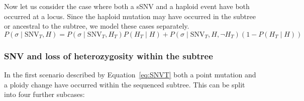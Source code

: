 \documentclass[../../main.tex]{subfiles}
\begin{document}
Now let us consider the case where both a sSNV and a haploid event have both occurred at a locus. Since the haploid mutation may have occurred in the subtree or ancestral to the subtree, we model these cases separately.
\begin{equation}
P(\sigma\mid\text{SNV}_T,H) = P(\sigma\mid\text{SNV}_T,H_T)P(H_T\mid H) + P(\sigma\mid\text{SNV}_T,H,\neg H_T)(1-P(H_T\mid H)) \label{eq:SNVT}
\end{equation}
\subsubsection*{SNV and loss of heterozygosity within the subtree}
In the first scenario described by Equation~\eqref{eq:SNVT} both a point mutation and a ploidy change have occurred within the sequenced subtree.
This can be split into four further subcases:
\end{document}

